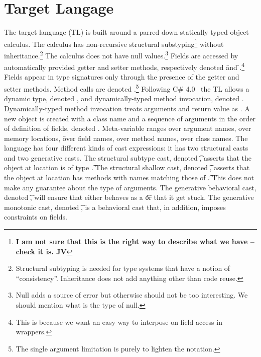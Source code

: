 \documentclass[a4paper,UKenglish,final]{lipics}
\begin{document}
\section*{Target Langage}

The target language (TL) is built around a parred down statically typed
object calculus. The calculus has non-recursive structural
substyping\footnote{\bf I am not sure that this is the right way to describe
  what we have -- check it is. JV} without inheritance.\footnote{Structural
  subtyping is needed for type systems that have a notion of
  ``consistency''. Inheritance does not add anything other than code reuse.}
The calculus does not have null values.\footnote{Null adds a source of error
  but otherwise should not be too interesting. We should mention what is the
  type of null.} Fields are accessed by automatically provided getter and
setter methods, respectively denoted \Get\x\f and \Set\x\f\e.\footnote{This
  is because we want an easy way to interpose on field access in wrappers.}
Fields appear in type signatures only through the presence of the getter and
setter methods. Method calls are denoted \Call\x\m\e.\footnote{The single
  argument limitation is purely to lighten the notation.} Following C\#
4.0~\cite{} the TL allows a dynamic type, denoted \any, and
dynamically-typed method invocation, denoted
\DynCall\x\m\e. Dynamically-typed method invocation treats arguments and
return value as \any. A new object is created with a class name and a
sequence of arguments in the order of definition of fields, denoted
\New\C{\b\e}.  Meta-variable \x ranges over argument names, \a over memory
locations, \f over field names, \m over method names, \C over class
names. The language has four different kinds of cast expressions: it has two
structural casts and two generative casts. The structural subtype cast,
denoted \SubCast\t\a, asserts that the object at location \a is of type
\t.  The structural shallow cast, denoted \ShaCast\t\a, asserts that the
object at location \a has methods with names matching those of \t. This does
not make any guarantee about the type of arguments.  The generative
behavioral cast, denoted \BehCast\t\a, will ensure that either \a behaves
as a \t or that it get stuck. The generative monotonic cast, denoted
\MonCast\t\a, is a behavioral cast that, in addition, imposes constraints
on fields.
\end{document}
